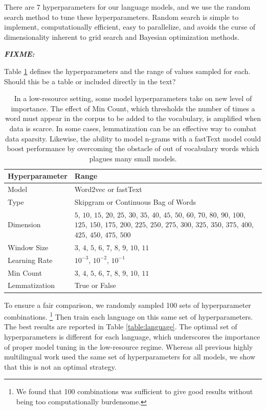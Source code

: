 \documentclass[11pt,a4paper]{article}
\newcommand{\fixme}[1]{{\color{red}\itshape \textbf{FIXME:} {#1}}}
\begin{document}
There are 7 hyperparameters for our language models,
and we use the random search method \citep{bergstra2012random} to tune these hyperparameters.
Random search is simple to implement, computationally efficient, easy to parallelize, and avoids the curse of dimensionality inherent to grid search and Bayesian optimization methods.
\fixme{
Table \ref{table:hyperparam} defines the hyperparameters and the range of values sampled for each.
Should this be a table or included directly in the text?
\begin{table}
   \begin{tabular}{lp{4cm}}
    Hyperparameter &  Range \\
   \toprule
   Model & Word2vec or fastText \\ [4pt]
   Type & Skipgram or Continuous Bag of Words \\ [4pt]
   Dimension & $5$, $10$, $15$, $20$, $25$, $30$, $35$, $40$, $45$, $50$,
                          $60$, $70$, $80$, $90$, $100$,
                          $125$, $150$, $175$, $200$, $225$, $250$, $275$, $300$, $325$, $350$, $375$, $400$, $425$, $450$, $475$, $500$ \\[4pt]
   Window Size & $3$, $4$, $5$, $6$, $7$, $8$, $9$, $10$, $11$ \\ [4pt]
   Learning Rate & $10^{-3}$, $10^{-2}$, $10^{-1}$ \\ [4pt]
   Min Count & $3$, $4$, $5$, $6$, $7$, $8$, $9$, $10$, $11$ \\ [4pt]
   Lemmatization & True or False \\ [2pt]
   \bottomrule
   \end{tabular}
    \caption{In a low-resource setting, some model hyperparameters take on new level of importance. The effect of Min Count, which thresholds the number of times a word must appear in the corpus to be added to the vocabulary, is amplified when data is scarce. In some cases, lemmatization can be an effective way to combat data sparsity. Likewise, the ability to model n-grams with a fastText model could boost performance by overcoming the obstacle of out of vocabulary words which plagues many small models.}
    \label{table:hyperparam}
\end{table}
}

To ensure a fair comparison,
we randomly sampled 100 sets of hyperparameter combinations.%
\footnote{We found that 100 combinations was sufficient to give good results without being too computationally burdensome.}
Then train each language on this same set of hyperparameters.
The best results are reported in Table \ref{table:language}.
The optimal set of hyperparameters is different for each language,
which underscores the importance of proper model tuning in the low-resource regime.
Whereas all previous highly multilingual work used the same set of hyperparameters for all models,
we show that this is not an optimal strategy.
\end{document}
